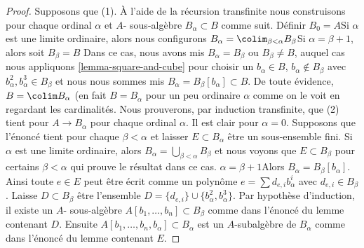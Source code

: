 \begin{proof}

Supposons que (1). À l'aide de la récursion transfinite nous construisons pour chaque ordinal $\alpha$
et $A$- sous-algèbre $B_\alpha \subset B$ comme suit. Définir $B_0 = A$Si $\alpha$
est une limite ordinaire, alors nous configurons $B_\alpha = \colim_{\beta < \alpha} B_\beta$Si $\alpha = \beta + 1$, alors soit
$B_\beta = B$ Dans ce cas, nous avons mis $B_\alpha = B_\beta$ ou
$B_\beta \not = B$, auquel cas nous appliquons \ref{lemma-square-and-cube}
pour choisir un $b_\alpha \in B$, $b_\alpha \not \in B_\beta$ avec
$b_\alpha^2, b_\alpha^3 \in B_\beta$
et nous nous sommes mis $B_\alpha = B_\beta[b_\alpha] \subset B$. De toute évidence, $B = \colim B_\alpha$ (en fait $B = B_\alpha$ pour un peu ordinaire $\alpha$ comme on le voit en regardant les cardinalités. Nous prouverons, par induction transfinite, que (2) tient pour
$A \to B_\alpha$ pour chaque ordinal $\alpha$. Il est clair pour
$\alpha = 0$. Supposons que l'énoncé tient pour chaque $\beta < \alpha$
et laisser $E \subset B_\alpha$ être un sous-ensemble fini. Si $\alpha$ est une limite ordinaire, alors
$B_\alpha = \bigcup_{\beta < \alpha} B_\beta$ et nous voyons que $E \subset B_\beta$ pour certains $\beta < \alpha$ qui prouve le résultat dans ce cas. $\alpha = \beta + 1$Alors $B_\alpha = B_\beta[b_\alpha]$. Ainsi toute $e \in E$
peut être écrit comme un polynôme $e = \sum d_{e, i}b_\alpha^i$
avec $d_{e, i} \in B_\beta$. Laisse $D \subset B_\beta$
être l'ensemble $D = \{d_{e, i}\} \cup \{b_\alpha^2, b_\alpha^3\}$. Par hypothèse d'induction, il existe un $A$- sous-algèbre $A[b_1, \ldots, b_n] \subset B_\beta$
comme dans l'énoncé du lemme contenant $D$. Ensuite $A[b_1, \ldots, b_n, b_\alpha] \subset B_\alpha$
est un $A$-subalgèbre de $B_\alpha$ comme dans l'énoncé du lemme contenant $E$.

\medskip\noindent


\end{proof}
